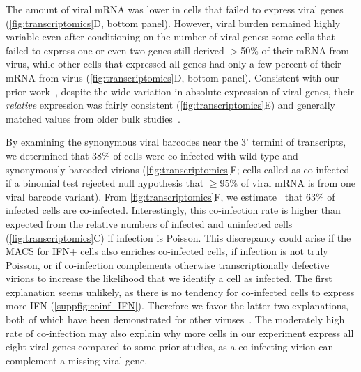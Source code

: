 \documentclass[lineno]{asm-article}
\newcommand{\FIG}[1]{\autoref{fig:#1}}
\newcommand{\SUPPFIG}[1]{\autoref{suppfig:#1}}
\begin{document}
The amount of viral mRNA was lower in cells that failed to express viral genes (\FIG{transcriptomics}D, bottom panel).
However, viral burden remained highly variable even after conditioning on the number of viral genes: some cells that failed to express one or even two genes still derived $>$50\% of their mRNA from virus, while other cells that expressed all genes had only a few percent of their mRNA from virus (\FIG{transcriptomics}D, bottom panel).
Consistent with our prior work~\cite{russell2018extreme}, despite the wide variation in absolute expression of viral genes, their \emph{relative} expression was fairly consistent (\FIG{transcriptomics}E) and generally matched values from older bulk studies~\cite{hatada1989control}.

By examining the synonymous viral barcodes near the 3' termini of transcripts, we determined that 38\% of cells were co-infected with wild-type and synonymously barcoded virions (\FIG{transcriptomics}F; cells called as co-infected if a binomial test rejected null hypothesis that $\ge$95\% of viral mRNA is from one viral barcode variant).
From \FIG{transcriptomics}F, we estimate~\cite{bloom2018estimating} that 63\% of infected cells are co-infected.
Interestingly, this co-infection rate is higher than expected from the relative numbers of infected and uninfected cells (\FIG{transcriptomics}C) if infection is Poisson.
This discrepancy could arise if the MACS for IFN+ cells also enriches co-infected cells, if infection is not truly Poisson, or if co-infection complements otherwise transcriptionally defective virions to increase the likelihood that we identify a cell as infected.
The first explanation seems unlikely, as there is no tendency for co-infected cells to express more IFN (\SUPPFIG{coinf_IFN}). 
Therefore we favor the latter two explanations, both of which have been demonstrated for other viruses~\cite{aguilera2017plaques, combe2015single}.
The moderately high rate of co-infection may also explain why more cells in our experiment express all eight viral genes compared to some prior studies, as a co-infecting virion can complement a missing viral gene. 
\end{document}

